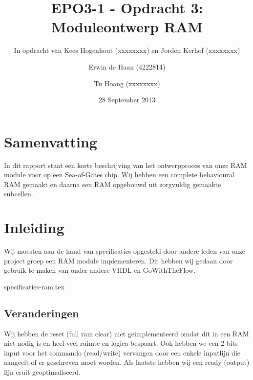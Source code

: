 \documentclass{scrartcl}  %
\author{Erwin {de Haan} (4222814) \and {Tu Hoang} (xxxxxxxx)}
\title{EPO3-1 - Opdracht 3: Moduleontwerp RAM}
\subtitle{In opdracht van Kees Hogenhout (xxxxxxxx) en Jorden Kerhof (xxxxxxxx)}
\date{28 September 2013}
\begin{document}
\maketitle
{}
\section*{Samenvatting}
In dit rapport staat een korte beschrijving van het ontwerpproces van onze RAM module voor op een Sea-of-Gates chip.
Wij hebben een complete behavioural RAM gemaakt en daarna een RAM opgebouwd uit zorgvuldig gemaakte subcellen.
\newpage
\setlength{\cftbeforetoctitleskip}{-3em}
\tableofcontents

\section{Inleiding}
Wij moesten aan de hand van specificaties opgesteld door andere leden van onze project groep een RAM module implementeren.
Dit hebben wij gedaan door gebruik te maken van onder andere VHDL en GoWithTheFlow.

\newpage
{}

{specificaties-ram.tex}

\subsection{Veranderingen}
Wij hebben de reset (full ram clear) niet geimplementeerd omdat dit in een RAM niet nodig is en heel veel ruimte en logica bespaart.
Ook hebben we een 2-bits input voor het commando (read/write) vervangen door een enkele inputlijn die aangeeft of er geschreven moet worden.
Als laatste hebben wij een ready (output) lijn eruit geoptimaliseerd.
\end{document}
